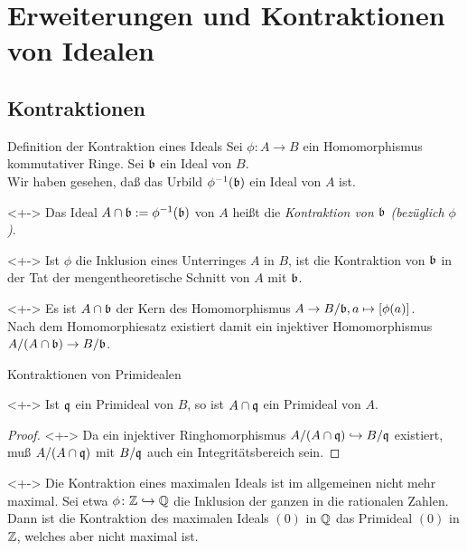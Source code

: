 \section{Erweiterungen und Kontraktionen von Idealen}

\subsection{Kontraktionen}

\begin{frame}{Definition der Kontraktion eines Ideals}
	Sei \(\phi\colon A \to B\) ein Homomorphismus kommutativer Ringe.
	Sei \(\mathfrak{b}\) ein Ideal von \(B\).
	\\
	Wir haben gesehen, daß das Urbild \(\phi^{-1}(\mathfrak{b})\)
	ein Ideal von
	\(A\) ist.
	\begin{definition}<+->
		Das Ideal \(A \cap \mathfrak{b} := \phi^{-1}(\mathfrak{b})\) von \(A\) heißt die
		\emph{Kontraktion von \(\mathfrak{b}\) (bezüglich \(\phi\))}.
	\end{definition}
	\begin{remark}<+->
		Ist \(\phi\) die Inklusion eines Unterringes \(A\) in \(B\), ist die 
		Kontraktion von \(\mathfrak{b}\) in der Tat der mengentheoretische Schnitt
		von \(A\) mit \(\mathfrak{b}\).
	\end{remark}
	\begin{visibleenv}<+->
		Es ist \(A \cap \mathfrak{b}\) der Kern des Homomorphismus
		\(A \to B/\mathfrak{b}, a \mapsto [\phi(a)]\).
		\\
		Nach dem Homomorphiesatz existiert damit ein injektiver Homomorphismus
		\(A/(A \cap \mathfrak{b}) \to B/\mathfrak{b}\).
	\end{visibleenv}
\end{frame}

\begin{frame}{Kontraktionen von Primidealen}
	\begin{proposition}<+->
		Ist \(\mathfrak{q}\) ein Primideal von \(B\), so ist \(A \cap \mathfrak{q}\) ein
		Primideal von \(A\).
	\end{proposition}
	\begin{proof}<+->
		Da ein injektiver Ringhomorphismus \(A/(A \cap \mathfrak{q}) \hookrightarrow B/\mathfrak{q}\) existiert,
		muß \(A/(A \cap \mathfrak{q})\) mit \(B/\mathfrak{q}\) auch ein Integritätsbereich sein.
	\end{proof}
	\begin{example}<+->
		Die Kontraktion eines maximalen Ideals ist im allgemeinen nicht mehr maximal.
		Sei etwa \(\phi\colon \mathbb Z \hookrightarrow \mathbb Q\) die Inklusion der ganzen in die
		rationalen Zahlen. Dann ist die Kontraktion des maximalen Ideals \((0)\) in
		\(\mathbb Q\) das Primideal \((0)\) in \(\mathbb Z\), welches aber nicht maximal 
		ist. 
	\end{example}
\end{frame}

